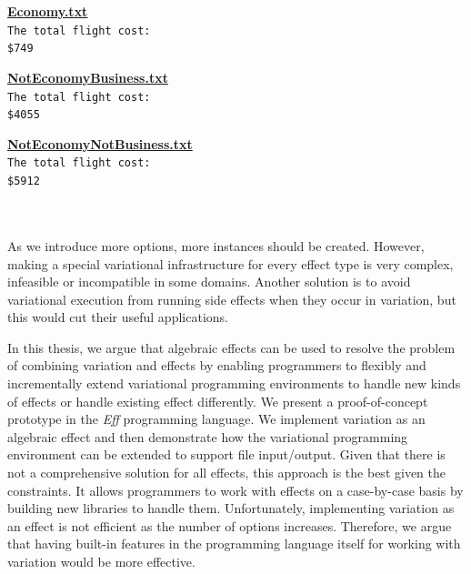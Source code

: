\begin{minipage}{0.3\textwidth}
\textbf{\underline{Economy.txt}} \\
\texttt{The total flight cost: }\\
\texttt{\$749}\\
\end{minipage}
\begin{minipage}{0.3\textwidth}
\textbf{\underline{NotEconomyBusiness.txt}} \\
\texttt{The total flight cost: }\\
\texttt{\$4055}\\
\end{minipage}
\begin{minipage}{0.3\textwidth}
\textbf{\underline{NotEconomyNotBusiness.txt}} \\
\texttt{The total flight cost: }\\
\texttt{\$5912}\\
\end{minipage}\\
\hfill\\
%
As we introduce more options, more instances should be created. However, making a special variational infrastructure for every effect type is very complex, infeasible or incompatible in some domains. Another solution is to avoid variational execution from running side effects when they occur in variation, but this would cut their useful applications.

In this thesis, we argue that algebraic effects can be used to resolve the problem of combining variation and effects by enabling programmers to flexibly and incrementally extend variational programming environments to handle new kinds of effects or handle existing effect differently. We present a proof-of-concept prototype in the \emph{Eff} programming language. We implement variation as an algebraic effect and then demonstrate how the variational programming environment can be extended to support file input/output. Given that there is not a comprehensive solution for all effects, this approach is the best given the constraints. It allows programmers to work with effects on a case-by-case basis by building new libraries to handle them. Unfortunately, implementing variation as an effect is not efficient as the number of options increases. Therefore, we argue that having built-in features in the programming language itself for working with variation would be more effective.

